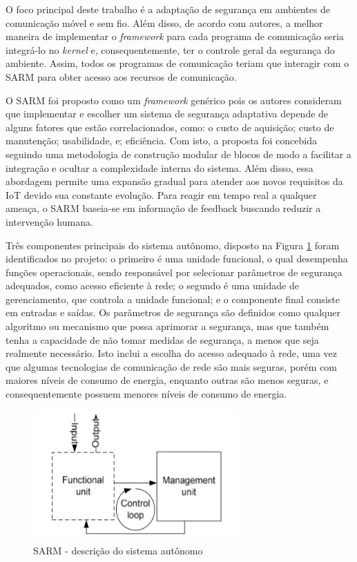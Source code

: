 \documentclass[tid,table]{texufpel} %
\begin{document}
O foco principal deste trabalho é a adaptação de segurança em ambientes de comunicação móvel e sem fio. Além disso, de acordo com autores, a melhor maneira de implementar o \textit{framework} para cada programa de comunicação seria integrá-lo no \textit{kernel} e, consequentemente, ter o controle geral da segurança do ambiente. Assim, todos os programas de comunicação teriam que interagir com o SARM para obter acesso aos recursos de comunicação.

O SARM foi proposto como um \textit{framework} genérico pois os autores consideram que implementar e escolher um sistema de segurança adaptativa depende de alguns fatores que estão correlacionados, como: o custo de aquisição; custo de manutenção; usabilidade, e; eficiência. Com isto, a proposta foi concebida seguindo uma metodologia de construção modular de blocos de modo a facilitar a integração e ocultar a complexidade interna do sistema. Além disso, essa abordagem permite uma expansão gradual para atender aos novos requisitos da IoT devido sua constante evolução. Para reagir em tempo real a qualquer ameaça, o SARM baseia-se em informação de feedback buscando reduzir a intervenção humana.

Três componentes principais do sistema autônomo, disposto na Figura \ref{sarm-description} foram identificados no projeto: o primeiro é uma unidade funcional, o qual desempenha funções operacionais, sendo responsável por selecionar parâmetros de segurança adequados, como acesso eficiente à rede; o segundo é uma unidade de gerenciamento, que controla a unidade funcional; e o componente final consiste em entradas e saídas. Os parâmetros de segurança são definidos como qualquer algoritmo ou mecanismo que possa aprimorar a segurança, mas que também tenha a capacidade de não tomar medidas de segurança, a menos que seja realmente necessário. Isto inclui a escolha do acesso adequado à rede, uma vez que algumas tecnologias de comunicação de rede são mais seguras, porém com maiores níveis de consumo de energia, enquanto outras são menos seguras, e consequentemente possuem menores níveis de consumo de energia.

\begin{figure}[ht]
\centering
\includegraphics[width=0.7\textwidth]{imagens/sarm-description.png}
\caption{SARM - descrição do sistema autônomo}
\label{sarm-description}
\end{figure}
\end{document}
